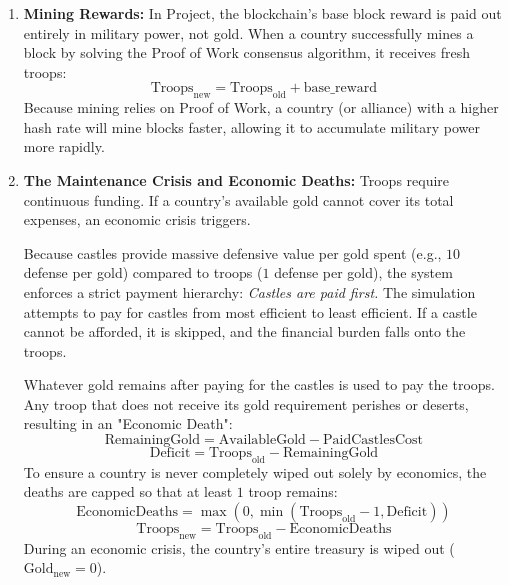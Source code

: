 \begin{enumerate}
    \item \textbf{Mining Rewards:} In Project, the blockchain's base block reward is paid out entirely in military power, not gold. When a country successfully mines a block by solving the Proof of Work consensus algorithm, it receives fresh troops:
    \begin{equation}
    \text{Troops}_{\text{new}} = \text{Troops}_{\text{old}} + \text{base\_reward}
    \end{equation}
    Because mining relies on Proof of Work, a country (or alliance) with a higher hash rate will mine blocks faster, allowing it to accumulate military power more rapidly.
    
        \item \textbf{The Maintenance Crisis and Economic Deaths:} Troops require continuous funding. If a country's available gold cannot cover its total expenses, an economic crisis triggers. 

    Because castles provide massive defensive value per gold spent (e.g., $10$ defense per gold) compared to troops ($1$ defense per gold), the system enforces a strict payment hierarchy: \textit{Castles are paid first.} The simulation attempts to pay for castles from most efficient to least efficient. If a castle cannot be afforded, it is skipped, and the financial burden falls onto the troops.
    
    Whatever gold remains after paying for the castles is used to pay the troops. Any troop that does not receive its gold requirement perishes or deserts, resulting in an "Economic Death":
    \begin{equation}
    \text{RemainingGold} = \text{AvailableGold} - \text{PaidCastlesCost}
    \end{equation}
    \begin{equation}
    \text{Deficit} = \text{Troops}_{\text{old}} - \text{RemainingGold}
    \end{equation}
    To ensure a country is never completely wiped out solely by economics, the deaths are capped so that at least $1$ troop remains:
    \begin{equation}
    \text{EconomicDeaths} = \max\left(0, \min(\text{Troops}_{\text{old}} - 1, \text{Deficit})\right)
    \end{equation}
    \begin{equation}
    \text{Troops}_{\text{new}} = \text{Troops}_{\text{old}} - \text{EconomicDeaths}
    \end{equation}
    During an economic crisis, the country's entire treasury is wiped out ($\text{Gold}_{\text{new}} = 0$).

\end{enumerate}

